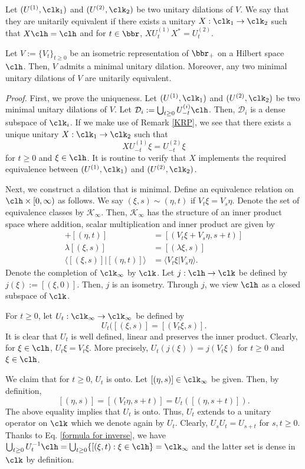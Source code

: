 Let $(U^{(1)},\clk_1)$ and $(U^{(2)},\clk_2)$ be two unitary dilations of $V$. We say that they are unitarily equivalent if there exists a unitary $X:\clk_1 \to \clk_2$ such that $X\clh=\clh$ and for $t \in \bbr$, $XU^{(1)}_tX^{*}=U^{(2)}_{t}$. 

\begin{thm}
Let $V:=\{V_t\}_{t \geq 0}$ be an isometric representation of $\bbr_{+}$ on a Hilbert space $\clh$. Then, $V$ admits a minimal unitary dilation. Moreover, any two minimal unitary dilations of $V$ are unitarily equivalent. 
\end{thm}
\textit{Proof.} First, we prove the uniqueness. Let $(U^{(1)},\clk_1)$ and $(U^{(2)},\clk_2)$ be two minimal unitary dilations of $V$. Let $\mathcal{D}_{i}:=\bigcup_{t \geq 0}U^{(i)}_{-t}\clh$. 
Then, $\mathcal{D}_i$ is a dense subspace of $\clk_i$. If we make use of Remark \ref{KRP}, we see that there exists a unique unitary $X:\clk_1 \to \clk_2$ such that 
\[
XU^{(1)}_{-t}\xi=U^{(2)}_{-t}\xi\]
for $t \geq 0$ and $\xi \in \clh$. It is routine to verify that $X$ implements the required equivalence between $(U^{(1)},\clk_1)$ and $(U^{(2)},\clk_2)$. 

Next, we construct a dilation that is minimal. Define an equivalence relation on $\clh \times [0,\infty)$ as follows. We say $(\xi,s) \sim (\eta,t)$ if $V_t\xi=V_s\eta$. Denote the set of equivalence classes by $\mathcal{K}_{\infty}$. Then, $\mathcal{K}_{\infty}$ has the structure of an inner product space where addition, scalar multiplication and inner product are given by 
\begin{align*}
[(\xi,s)]+[(\eta,t)]&=[(V_t\xi+V_s\eta,s+t)]\\
\lambda[(\xi,s)]&=[(\lambda\xi,s)]\\
\langle [(\xi,s)]|[(\eta,t)]\rangle&=\langle V_t\xi|V_s\eta \rangle.
\end{align*}
Denote the completion of $\clk_{\infty}$ by $\clk$. Let $j:\clh \to \clk$ be defined by $j(\xi):=[(\xi,0)]$. Then, $j$ is an isometry. Through $j$, we view $\clh$ as a closed subspace of $\clk$. 

For $t \geq 0$, let $U_t:\clk_\infty \to \clk_\infty$ be defined by 
\[
U_t([(\xi,s)]=[(V_t\xi,s)].\]
It is clear that $U_t$ is well defined, linear and preserves the inner product. Clearly, for $\xi \in \clh$, $U_t\xi=V_t\xi$. More precisely, $U_t(j(\xi))=j(V_t\xi)$ for $t \geq 0$ and $\xi \in \clh$.

We claim that for $t \geq 0$,  $U_t$ is onto. Let $[(\eta,s)] \in \clk_\infty$ be given. Then, by definition, 
\begin{equation}
\label{formula for inverse}
[(\eta,s)]=[(V_t\eta,s+t)]=U_t([(\eta,s+t)]).\end{equation}
The above equality implies that $U_t$ is onto. %
Thus, $U_t$ extends to a unitary operator on $\clk$ which we denote again by $U_t$. Clearly, $U_sU_t=U_{s+t}$ for $s,t \geq 0$. Thanks to Eq. \ref{formula for inverse}, we have $\bigcup_{t \geq 0}U_{t}^{-1}\clh=\bigcup_{t \geq 0}\{[(\xi,t):\xi \in \clh\}=\clk_\infty$ and the latter set is dense in $\clk$ by definition. 

